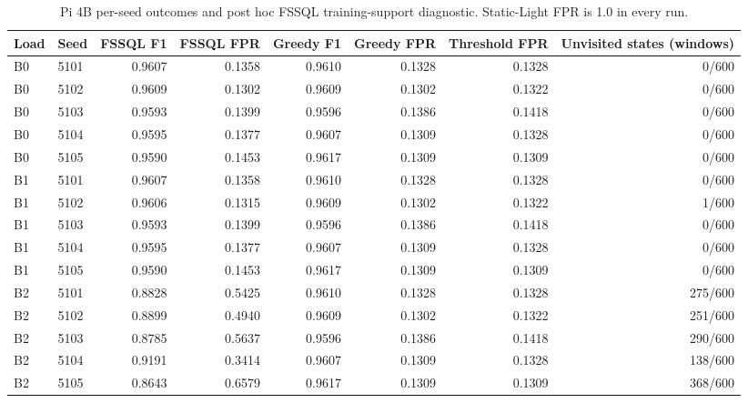 \begin{table}[t]\caption{Pi 4B per-seed outcomes and post hoc FSSQL training-support diagnostic. Static-Light FPR is 1.0 in every run.}\centering\footnotesize
\begin{tabular}{llrrrrrr}\toprule
Load & Seed & FSSQL F1 & FSSQL FPR & Greedy F1 & Greedy FPR & Threshold FPR & Unvisited states (windows) \\\midrule
B0 & 5101 & 0.9607 & 0.1358 & 0.9610 & 0.1328 & 0.1328 & 0/600 \\
B0 & 5102 & 0.9609 & 0.1302 & 0.9609 & 0.1302 & 0.1322 & 0/600 \\
B0 & 5103 & 0.9593 & 0.1399 & 0.9596 & 0.1386 & 0.1418 & 0/600 \\
B0 & 5104 & 0.9595 & 0.1377 & 0.9607 & 0.1309 & 0.1328 & 0/600 \\
B0 & 5105 & 0.9590 & 0.1453 & 0.9617 & 0.1309 & 0.1309 & 0/600 \\
B1 & 5101 & 0.9607 & 0.1358 & 0.9610 & 0.1328 & 0.1328 & 0/600 \\
B1 & 5102 & 0.9606 & 0.1315 & 0.9609 & 0.1302 & 0.1322 & 1/600 \\
B1 & 5103 & 0.9593 & 0.1399 & 0.9596 & 0.1386 & 0.1418 & 0/600 \\
B1 & 5104 & 0.9595 & 0.1377 & 0.9607 & 0.1309 & 0.1328 & 0/600 \\
B1 & 5105 & 0.9590 & 0.1453 & 0.9617 & 0.1309 & 0.1309 & 0/600 \\
B2 & 5101 & 0.8828 & 0.5425 & 0.9610 & 0.1328 & 0.1328 & 275/600 \\
B2 & 5102 & 0.8899 & 0.4940 & 0.9609 & 0.1302 & 0.1322 & 251/600 \\
B2 & 5103 & 0.8785 & 0.5637 & 0.9596 & 0.1386 & 0.1418 & 290/600 \\
B2 & 5104 & 0.9191 & 0.3414 & 0.9607 & 0.1309 & 0.1328 & 138/600 \\
B2 & 5105 & 0.8643 & 0.6579 & 0.9617 & 0.1309 & 0.1309 & 368/600 \\
\bottomrule\end{tabular}\end{table}
